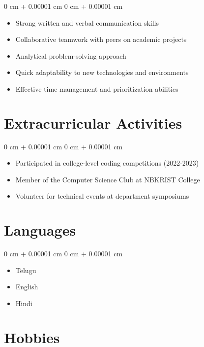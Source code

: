 \documentclass[10pt, letterpaper]{article}
\newenvironment{highlights}{
    \begin{itemize}[
        topsep=0.10 cm,
        parsep=0.10 cm,
        partopsep=0pt,
        itemsep=0pt,
        leftmargin=0 cm + 10pt
    ]
}{
    \end{itemize}
}
\newenvironment{onecolentry}{
    \begin{adjustwidth}{
        0 cm + 0.00001 cm
    }{
        0 cm + 0.00001 cm
    }
}{
    \end{adjustwidth}
}
\begin{document}
    \begin{onecolentry}
        \begin{highlights}
            \item Strong written and verbal communication skills
            \item Collaborative teamwork with peers on academic projects
            \item Analytical problem-solving approach
            \item Quick adaptability to new technologies and environments
            \item Effective time management and prioritization abilities
        \end{highlights}
    \end{onecolentry}

    \section{Extracurricular Activities}

    \begin{onecolentry}
        \begin{highlights}
            \item Participated in college-level coding competitions (2022-2023)
            \item Member of the Computer Science Club at NBKRIST College
            \item Volunteer for technical events at department symposiums
        \end{highlights}
    \end{onecolentry}

    \section{Languages}

    \begin{onecolentry}
        \begin{highlights}
            \item Telugu
            \item English
            \item Hindi
        \end{highlights}
    \end{onecolentry}

    \section{Hobbies}
\end{document}
